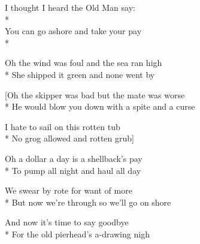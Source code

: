 
\contd
{}

\versemark
I thought I heard the Old Man say:\\*
\vin{}\\
You can go ashore and take your pay\\*
\vin{}

\contd
{}


\versemark
Oh the wind was foul and the sea ran high\etc\\*
She shipped it green and none went by\etcrefrain

[Oh the skipper was bad but the mate was worse\etc\\*
He would blow you down with a spite and a curse\etc

I hate to sail on this rotten tub\etc\\*
No grog allowed and rotten grub\etc]

\versemark
Oh a dollar a day is a shellback’s pay\etc\\*
To pump all night and haul all day\etcrefrain

\versemark
We swear by rote for want of more\etc\\*
But now we’re through so we’ll go on shore\etcrefrain

\versemark
And now it’s time to say goodbye\etc\\*
For the old pierhead’s a-drawing nigh\etcrefrain


